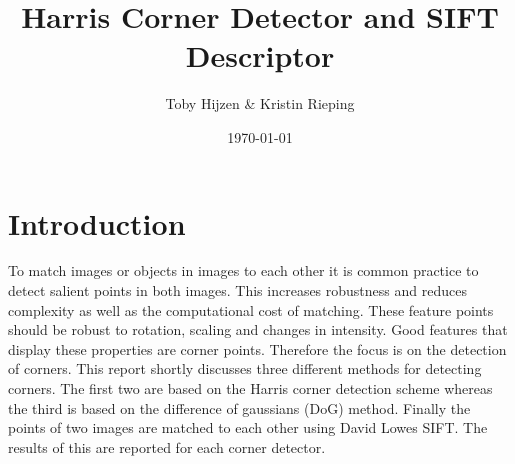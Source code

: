 \documentclass{article}
\title{Harris Corner Detector and SIFT Descriptor}
\author{Toby Hijzen \& Kristin Rieping}
\date{\today}
\begin{document}
\maketitle

\section{Introduction}
To match images or objects in images to each other it is common practice to detect salient points in both images. This increases robustness and reduces complexity as well as the computational cost of matching. These feature points should be robust to rotation, scaling and changes in intensity. Good features that display these properties are corner points. Therefore the focus is on the detection of corners. This report shortly discusses three different methods for detecting corners. The first two are based on the Harris corner detection scheme whereas the third is based on the difference of gaussians (DoG) method. Finally the points of two images are matched to each other using David Lowes SIFT. The results of this are reported for each corner detector.
\end{document}
